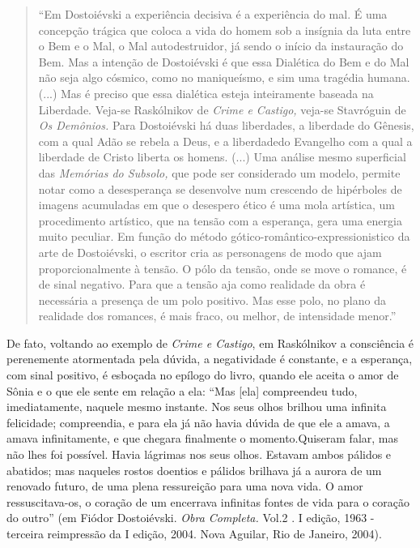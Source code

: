 \begin{quote}
``Em Dostoiévski a experiência decisiva é a experiência do mal. É uma
concepção trágica que coloca a vida do homem sob a insígnia da luta
entre o Bem e o Mal, o Mal autodestruidor, já sendo o início da
instauração do Bem. Mas a intenção de Dostoiévski é que essa Dialética
do Bem e do Mal não seja algo cósmico, como no maniqueísmo, e sim uma
tragédia humana. (...) Mas é preciso que essa dialética esteja
inteiramente baseada na Liberdade. Veja-se Raskólnikov de \emph{Crime e
Castigo,} veja-se Stavróguin de \emph{Os Demônios.} Para Dostoiévski há
duas liberdades, a liberdade do Gênesis, com a qual Adão se rebela a
Deus, e a liberdadedo Evangelho com a qual a liberdade de Cristo liberta
os homens. (...) Uma análise mesmo superficial das \emph{Memórias do
Subsolo,} que pode ser considerado um modelo, permite notar como a
desesperança se desenvolve num crescendo de hipérboles de imagens
acumuladas em que o desespero ético é uma mola artística, um
procedimento artístico, que na tensão com a esperança, gera uma energia
muito peculiar. Em função do método gótico-romântico-expressionistico da
arte de Dostoiévski, o escritor cria as personagens de modo que ajam
proporcionalmente à tensão. O pólo da tensão, onde se move o romance, é
de sinal negativo. Para que a tensão aja como realidade da obra é
necessária a presença de um polo positivo. Mas esse polo, no plano da
realidade dos romances, é mais fraco, ou melhor, de intensidade menor.''
\end{quote}

De fato, voltando ao exemplo de \emph{Crime e Castigo}, em Raskólnikov a
consciência é perenemente atormentada pela dúvida, a negatividade é
constante, e a esperança, com sinal positivo, é esboçada no epílogo do
livro, quando ele aceita o amor de Sônia e o que ele sente em relação a
ela: ``Mas {[}ela{]} compreendeu tudo, imediatamente, naquele mesmo
instante. Nos seus olhos brilhou uma infinita felicidade; compreendia, e
para ela já não havia dúvida de que ele a amava, a amava infinitamente,
e que chegara finalmente o momento.Quiseram falar, mas não lhes foi
possível. Havia lágrimas nos seus olhos. Estavam ambos pálidos e
abatidos; mas naqueles rostos doentios e pálidos brilhava já a aurora de
um renovado futuro, de uma plena ressureição para uma nova vida. O amor
ressuscitava-os, o coração de um encerrava infinitas fontes de vida para
o coração do outro'' (em Fiódor Dostoiévski. \emph{Obra Completa.} Vol.2
. I edição, 1963 - terceira reimpressão da I edição, 2004. Nova Aguilar,
Rio de Janeiro, 2004).


